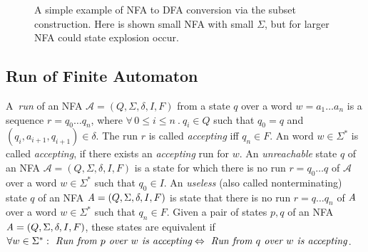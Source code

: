 \begin{figure}[t]
\begin{center}
\end{center}
	\caption{A simple example of NFA to DFA conversion via the subset construction. 
    Here is shown small NFA with small $\Sigma$, but for larger NFA could state explosion occur.}
    \label{pic_sub}
	\end{figure}



	\subsection{Run of Finite Automaton}
	\label{defRun}
  A~\emph{run} of an NFA $\mathcal{A}=(Q,\Sigma,\delta,I,F)$ from a state $q$
  over a word $w=a_1\ldots a_n$ is a sequence $r = q_0 \ldots q_n$, where $\forall\,0\leq i \leq n\ .\ q_i\in Q$ 
  such that $q_0=q$ and $(q_i,a_{i+1},q_{i+1})\in \delta$. 
  The run $r$ is called \emph{accepting} iff $q_n \in F$. 
	An word $w \in \Sigma^{*}$ is called \emph{accepting}, if there exists an \emph{accepting} run for $w$.
  An \emph{unreachable} state $q$ of an NFA $\mathcal{A}=(Q,\Sigma,\delta,I,F)$ is a state for which there is no run $r=q_0\ldots q$ of 
  $\mathcal{A}$ over a word $w \in \Sigma^{*}$ 
  such that $q_0\in I$.
  An \emph{useless} (also called nonterminating) state $q$ of an NFA $\emph{A}=(Q,\Sigma,\delta,I,F)$ is state that there is no run $r=q\ldots q_n$ 
  of $\emph{A}$ over a word
  $w \in \Sigma^{*}$ such that $q_n \in F$.
  Given a pair of states $p,q$ of an NFA $\emph{A}=(Q,\Sigma,\delta,I,F)$, these states are equivalent if 
  $\forall w \in \Sigma^{*}: \emph{ Run from } p \emph{ over } w \emph{ is accepting} \Leftrightarrow 
			\emph{ Run from } q \emph{ over } w \emph{ is accepting}$.

